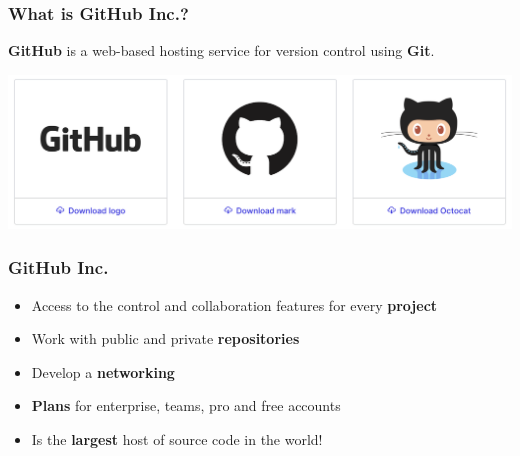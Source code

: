 \documentclass{beamer}
\begin{document}
\begin{frame}
\frametitle{What is GitHub Inc.?}

\begin{center}
\textbf{GitHub} is a web-based hosting service for version control using \textbf{Git}.
\end{center}

\begin{center}
\includegraphics[scale=0.2]{img/github_logos.png}
\end{center}
\end{frame}


\begin{frame}
\frametitle{GitHub Inc.}
\begin{itemize}
    \item Access to the control and collaboration features for every \textbf{project} \hfill \break
    \item Work with public and private \textbf{repositories} \hfill \break
    \item Develop a \textbf{networking} \hfill \break
    \item \textbf{Plans} for enterprise, teams, pro and free accounts \hfill \break
    \item Is the \textbf{largest} host of source code in the world! \hfill \break
\end{itemize}
\end{frame}
\end{document}
